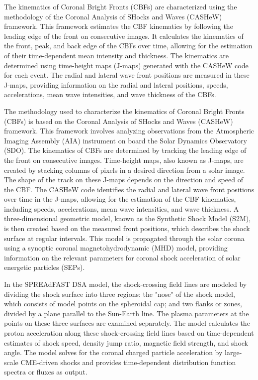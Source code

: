 The kinematics of Coronal Bright Fronts (CBFs) are characterized using the methodology of the Coronal Analysis of SHocks and Waves (CASHeW) framework. This framework estimates the CBF kinematics by following the leading edge of the front on consecutive images. It calculates the kinematics of the front, peak, and back edge of the CBFs over time, allowing for the estimation of their time-dependent mean intensity and thickness. The kinematics are determined using time-height maps (J-maps) generated with the CASHeW code for each event. The radial and lateral wave front positions are measured in these J-maps, providing information on the radial and lateral positions, speeds, accelerations, mean wave intensities, and wave thickness of the CBFs.

The methodology used to characterize the kinematics of Coronal Bright Fronts (CBFs) is based on the Coronal Analysis of SHocks and Waves (CASHeW) framework. This framework involves analyzing observations from the Atmospheric Imaging Assembly (AIA) instrument on board the Solar Dynamics Observatory (SDO). The kinematics of CBFs are determined by tracking the leading edge of the front on consecutive images. Time-height maps, also known as J-maps, are created by stacking columns of pixels in a desired direction from a solar image. The shape of the track on these J-maps depends on the direction and speed of the CBF. The CASHeW code identifies the radial and lateral wave front positions over time in the J-maps, allowing for the estimation of the CBF kinematics, including speeds, accelerations, mean wave intensities, and wave thickness. A three-dimensional geometric model, known as the Synthetic Shock Model (S2M), is then created based on the measured front positions, which describes the shock surface at regular intervals. This model is propagated through the solar corona using a synoptic coronal magnetohydrodynamic (MHD) model, providing information on the relevant parameters for coronal shock acceleration of solar energetic particles (SEPs).

In the SPREAdFAST DSA model, the shock-crossing field lines are modeled by dividing the shock surface into three regions: the "nose" of the shock model, which consists of model points on the spheroidal cap; and two flanks or zones, divided by a plane parallel to the Sun-Earth line. The plasma parameters at the points on these three surfaces are examined separately. The model calculates the proton acceleration along these shock-crossing field lines based on time-dependent estimates of shock speed, density jump ratio, magnetic field strength, and shock angle. The model solves for the coronal charged particle acceleration by large-scale CME-driven shocks and provides time-dependent distribution function spectra or fluxes as output.

